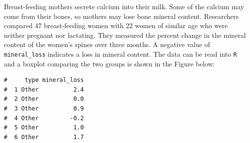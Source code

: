 \documentclass[letterpaper,9pt,twoside,printwatermark=false]{pinp}
\begin{document}
Breast-feeding mothers secrete calcium into their milk. Some of the
calcium may come from their bones, so mothers may lose bone mineral
content. Researchers compared 47 breast-feeding women with 22 women of
similar age who were neither pregnant nor lactating. They measured the
percent change in the mineral content of the women's spines over three
months. A negative value of \texttt{mineral\_loss} indicates a loss in
mineral content. The data can be read into \texttt{R} and a boxplot
comparing the two groups is shown in the Figure below:

\begin{Shaded}
\begin{Highlighting}[]
\StringTok{ }\NormalTok{(}\NormalTok{)}
\end{Highlighting}
\end{Shaded}

\begin{ShadedResult}
\begin{verbatim}
#     type mineral_loss
#  1 Other          2.4
#  2 Other          0.0
#  3 Other          0.9
#  4 Other         -0.2
#  5 Other          1.0
#  6 Other          1.7
\end{verbatim}
\end{ShadedResult}

\begin{Shaded}
\begin{Highlighting}[]
\OperatorTok{::}\OperatorTok{~}\StringTok{ }
\end{Highlighting}
\end{Shaded}
\end{document}

